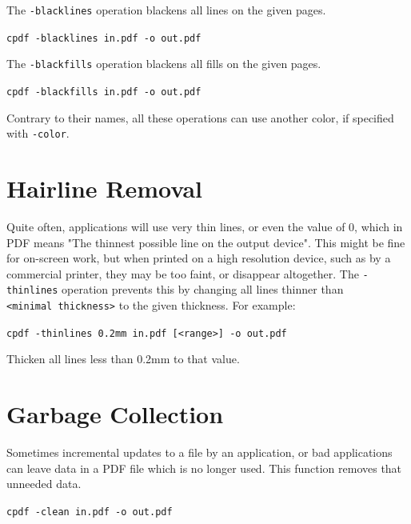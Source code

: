 \documentclass{book}
\begin{document}
\noindent The \texttt{-blacklines} operation blackens all lines on the given pages.

  \begin{framed}
    \noindent\small\verb!cpdf -blacklines in.pdf -o out.pdf!
  \end{framed}


\noindent The \texttt{-blackfills} operation blackens all fills on the given pages.

  \begin{framed}
    \noindent\small\verb!cpdf -blackfills in.pdf -o out.pdf!
  \end{framed}

\noindent Contrary to their names, all these operations can use another color, if specified with \texttt{-color}.

  \section{Hairline Removal}
  Quite often, applications will use very thin lines, or even the value of 0,
which in PDF means "The thinnest possible line on the output device". This
might be fine for on-screen work, but when printed on a high resolution device,
such as by a commercial printer, they may be too faint, or disappear
altogether. The \texttt{-thinlines} operation prevents this by changing all lines
thinner than \texttt{<minimal~thickness>} to the given thickness. For example:
  \begin{framed}
  \small\noindent\verb!cpdf -thinlines 0.2mm in.pdf [<range>] -o out.pdf!

  \vspace{2.5mm}
  \noindent Thicken all lines less than 0.2mm to that value.
  \end{framed} 

  \section{Garbage Collection}
  Sometimes incremental updates to a file by an application, or bad
applications can leave data in a PDF file which is no longer used. This
function removes that unneeded data.

  \begin{framed}
  \small\noindent\verb!cpdf -clean in.pdf -o out.pdf!
  \end{framed}
\end{document}
